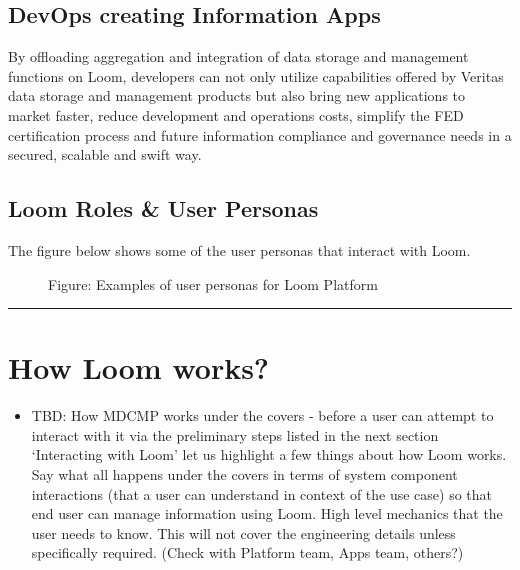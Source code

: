 \documentclass[letterpaper,10pt,english]{sphinxmanual}
\begin{document}
\section{DevOps creating Information Apps}
\label{\detokenize{loom_getting_started_guide:devops-creating-information-apps}}
By offloading aggregation and integration of data storage and management functions on Loom, developers can not only utilize capabilities offered by Veritas data storage and management products but also bring new applications to market faster, reduce development and operations costs, simplify the FED certification process and future information compliance and governance needs in a secured, scalable and swift way.


\section{Loom Roles \& User Personas}
\label{\detokenize{loom_getting_started_guide:loom-roles-user-personas}}
The figure below shows some of the user personas that interact with Loom.

\begin{figure}[htbp]
\centering
\capstart

\noindent{}
\caption{Figure: Examples of user personas for Loom Platform}\label{\detokenize{loom_getting_started_guide:id13}}\end{figure}


\bigskip\hrule\bigskip



\chapter{How Loom works?}
\label{\detokenize{loom_getting_started_guide:how-loom-works}}\begin{itemize}
\item {} 
TBD: How MDCMP works under the covers - before a user can attempt to interact with it via the preliminary steps listed in the next section ‘Interacting with Loom’ let us highlight a few things about how Loom works. Say what all happens under the covers in terms of system component interactions (that a user can understand in context of the use case) so that end user can manage information using Loom. High level mechanics that the user needs to know. This will not cover the engineering details unless specifically required. (Check with Platform team, Apps team, others?)

\end{itemize}
\end{document}
